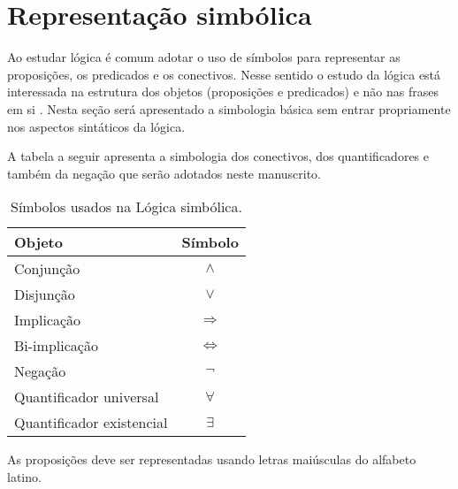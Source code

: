 \section{Representação simbólica}\label{sec:Representacao-simbolica}

Ao estudar lógica é comum adotar o uso de símbolos para representar as proposições, os predicados e os conectivos. Nesse sentido o estudo da lógica está interessada na estrutura dos objetos (proposições e predicados) e não nas frases em si \cite{joaoPavao2014}. Nesta seção será apresentado a simbologia básica sem entrar propriamente nos aspectos sintáticos da lógica.

A tabela a seguir apresenta a simbologia dos conectivos, dos quantificadores e também da negação que serão adotados neste manuscrito.

\begin{table}[h]
	\centering
	\begin{tabular}{lc}
		\hline
		\textbf{Objeto} & \textbf{Símbolo}\\
		\hline
		Conjunção & $\land$\\
		Disjunção & $\lor$\\
		Implicação & $\Rightarrow$\\
		Bi-implicação & $\Leftrightarrow$\\
		Negação & $\neg$\\
		Quantificador universal & $\forall$\\
		Quantificador existencial & $\exists$\\
		\hline
	\end{tabular}
	\caption{Símbolos usados na Lógica simbólica.}
	\label{tab:SimbolosLogicos}
\end{table}

\begin{definition}\label{def:RepresentacaoProposicoes}
	As proposições deve ser representadas usando letras maiúsculas do alfabeto latino.
\end{definition}

